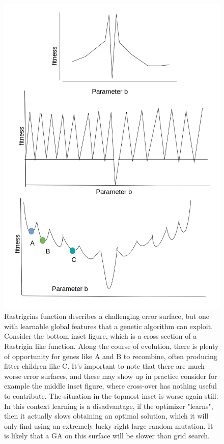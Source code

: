 \begin{figure}
\centering
      \label{fig:test1}
      \centering
      \includegraphics[scale=0.75]{figures/spectrum_worst_error_surfaces2.jpg}
      \caption[Hypothetical Error Functions, Worse than Rastrigrins function]{Rastrigrins function describes a challenging error surface, but one with learnable global features that a genetic algorithm can exploit. Consider the bottom inset figure, which is a cross section of a Rastrigin like function. Along the course of evolution, there is plenty of opportunity for genes like A and B to recombine, often producing fitter children like C. It's important to note that there are much worse error surfaces, and these may show up in practice consider for example the middle inset figure, where cross-over has nothing useful to contribute.
      The situation in the topmost inset is worse again still. In this context learning is a disadvantage, if the optimizer "learns", then it actually slows obtaining an optimal solution, which it will only find using an extremely lucky right large random mutation. It is likely that a GA on this surface will be slower than grid search.}
      \label{fig:test2}
\end{figure} 

